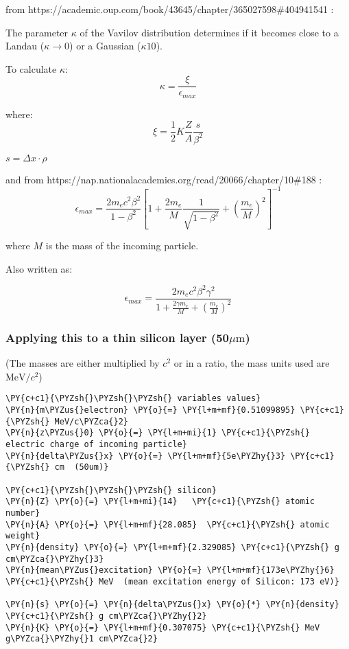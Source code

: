     from https://academic.oup.com/book/43645/chapter/365027598\#404941541 :

The parameter \(\kappa\) of the Vavilov distribution determines if it
becomes close to a Landau (\(\kappa\rightarrow0\)) or a Gaussian
(\(\kappa 10\)).

To calculate \(\kappa\): 
\[
\kappa = \frac{\xi}{\epsilon_{max}}
\]

where: \[
\xi = \frac{1}{2} K \frac{Z}{A} \frac{s} {\beta^2}
\]

\(s = \Delta x \cdot \rho\)

and from https://nap.nationalacademies.org/read/20066/chapter/10\#188 :
\[
\epsilon_{max} = \frac{2m_e c^2 \beta^2}{1-\beta^2}\left[ 1 + \frac{2m_e}{M}\frac{1}{\sqrt{1-\beta^2}} + \left(\frac{m_e}{M}\right)^2 \right]^{-1}
\]

where \(M\) is the mass of the incoming particle.

Also written as:

\[
\epsilon_{max} = \frac{2m_e c^2 \beta^2 \gamma^2} { 1 + \frac{2\gamma m_e}{M} + \left(\frac{m_e}{M}\right)^2}
\]

    \hypertarget{applying-this-to-a-thin-silicon-layer-50mu-textm}{%
\subsubsection{\texorpdfstring{Applying this to a thin silicon layer
(50\(\mu \text{m}\))}{Applying this to a thin silicon layer (50\textbackslash mu \textbackslash text\{m\})}}\label{applying-this-to-a-thin-silicon-layer-50mu-textm}}

(The masses are either multiplied by \(c^2\) or in a ratio, the mass
units used are \(\text{MeV}/c^2\))

    \begin{tcolorbox}[breakable, size=fbox, boxrule=1pt, pad at break*=1mm,colback=cellbackground, colframe=cellborder]
\begin{Verbatim}[commandchars=\\\{\}]
\PY{c+c1}{\PYZsh{}\PYZsh{}\PYZsh{} variables values}
\PY{n}{m\PYZus{}electron} \PY{o}{=} \PY{l+m+mf}{0.51099895} \PY{c+c1}{\PYZsh{} MeV/c\PYZca{}2}
\PY{n}{z\PYZus{}0} \PY{o}{=} \PY{l+m+mi}{1} \PY{c+c1}{\PYZsh{} electric charge of incoming particle}
\PY{n}{delta\PYZus{}x} \PY{o}{=} \PY{l+m+mf}{5e\PYZhy{}3} \PY{c+c1}{\PYZsh{} cm  (50um)}

\PY{c+c1}{\PYZsh{}\PYZsh{}\PYZsh{} silicon}
\PY{n}{Z} \PY{o}{=} \PY{l+m+mi}{14}   \PY{c+c1}{\PYZsh{} atomic number}
\PY{n}{A} \PY{o}{=} \PY{l+m+mf}{28.085}  \PY{c+c1}{\PYZsh{} atomic weight}
\PY{n}{density} \PY{o}{=} \PY{l+m+mf}{2.329085} \PY{c+c1}{\PYZsh{} g cm\PYZca{}\PYZhy{}3}
\PY{n}{mean\PYZus{}excitation} \PY{o}{=} \PY{l+m+mf}{173e\PYZhy{}6} \PY{c+c1}{\PYZsh{} MeV  (mean excitation energy of Silicon: 173 eV)}

\PY{n}{s} \PY{o}{=} \PY{n}{delta\PYZus{}x} \PY{o}{*} \PY{n}{density} \PY{c+c1}{\PYZsh{} g cm\PYZca{}\PYZhy{}2}
\PY{n}{K} \PY{o}{=} \PY{l+m+mf}{0.307075} \PY{c+c1}{\PYZsh{} MeV g\PYZca{}\PYZhy{}1 cm\PYZca{}2}
\end{Verbatim}
\end{tcolorbox}

